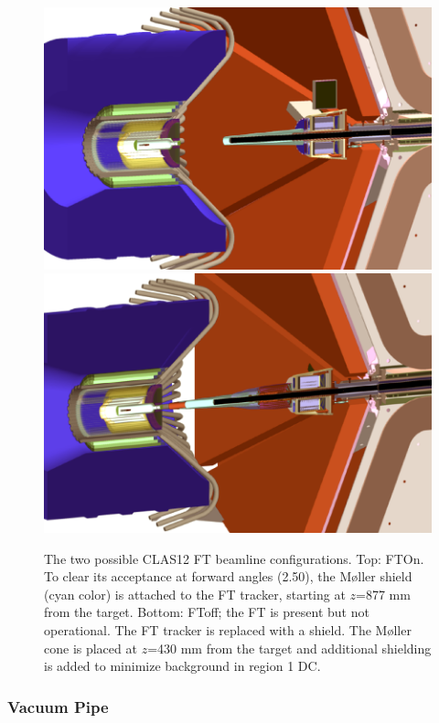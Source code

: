 \begin{figure}
	\centering
	\includegraphics[width=0.99\columnwidth,keepaspectratio]{img/ftOnGeometry.png}
	\includegraphics[width=0.99\columnwidth,keepaspectratio]{img/ftOffGeometry.png}
	\caption{The two possible CLAS12 FT beamline configurations. Top: FTOn. To clear its acceptance at forward angles (2.50\mdeg),
             the M\o ller shield (cyan color) is attached to the FT tracker, starting at $z$=877 mm from the target.
             Bottom: FToff; the FT is present but not operational. The FT tracker is replaced with a shield.
             The M\o ller cone is placed at $z$=430 mm from the target and additional shielding
             is added to minimize background in region 1 DC.}
	\label{fig:beamlineGeometry}
\end{figure}

\subsubsection{Vacuum Pipe}

